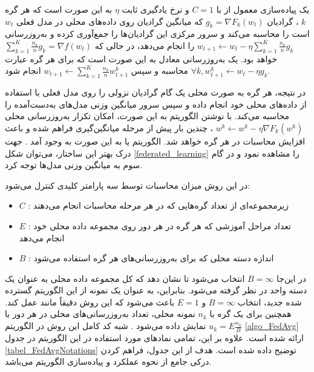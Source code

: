 یک پیاده‌سازی معمول از
با
$C = 1$
و نرخ یادگیری ثابت
$\eta$
به این صورت است که هر گره
$k$%
، گرادیان
$g_k=\nabla F_k\left(w_t\right)$
که میانگین گرادیان روی داده‌های محلی در مدل فعلی
$w_t$
است را محاسبه می‌کند و سرور مرکزی این گرادیان‌ها را جمع‌آوری کرده و به‌روزرسانی
$w_{t+1} \leftarrow w_t-\eta \sum_{k=1}^K \frac{n_k}{n} g_k$
را انجام می‌دهد، در حالی که
$\sum_{k=1}^K \frac{n_k}{n} g_k=\nabla f\left(w_t\right)$
خواهد بود. یک به‌روزرسانی معادل به این صورت است که برای هر گره عبارت
$\forall k, w_{t+1}^k \leftarrow w_t-\eta g_k$
محاسبه و سپس
$w_{t+1} \leftarrow \sum_{k=1}^K \frac{n_k}{n} w_{t+1}^k$
انجام شود.

در نتیجه، هر گره به صورت محلی یک گام گرادیان نزولی را روی مدل فعلی با استفاده از داده‌های محلی خود انجام داده و سپس سرور میانگین وزنی مدل‌های به‌دست‌آمده را محاسبه می‌کند. با نوشتن الگوریتم به این صورت، امکان تکرار به‌روزرسانی محلی
$w^k \leftarrow w^k-\eta \nabla F_k\left(w^k\right)$%
، چندین بار پیش از مرحله میانگین‌گیری فراهم شده و باعث افزایش محاسبات در هر گره خواهد شد. الگوریتم
یا
به این صورت به وجود آمد
\cite{mcmahan2017communication}.
جهت درک بهتر این ساختار، می‌توان شکل 
\ref{federated_learning} 
را مشاهده نمود و در گام سوم به میانگین وزنی مدل‌ها توجه کرد.

در این روش میزان محاسبات توسط سه پارامتر کلیدی کنترل می‌شود:
\begin{itemize}
	\itemsep-1mm 
	\item
	$C$%
: زیرمجموعه‌ای از تعداد گره‌هایی که در هر مرحله محاسبات انجام می‌دهند

	\item
	$E$%
: تعداد مراحل آموزشی که هر گره در هر دور روی مجموعه داده محلی خود انجام می‌دهد
	
	\item
	$B$%
: اندازه دسته محلی که برای به‌روزرسانی‌های هر گره استفاده می‌شود
	
\end{itemize}
در این‌جا
$B = \infty$
انتخاب می‌شود تا نشان دهد که کل مجموعه داده محلی به عنوان یک دسته واحد در نظر گرفته می‌شود. بنابراین، به عنوان یک نمونه از این الگوریتم گسترده شده جدید، انتخاب
$B = \infty$
و
$E = 1$
باعث می‌شود که این روش دقیقاً مانند
عمل کند. همچنین برای یک گره با
$n_k$
نمونه محلی، تعداد به‌روزرسانی‌های محلی در هر دور با
$u_k=E \frac{n_k}{B}$
نمایش داده می‌شود
\cite{mcmahan2017communication}.
شبه کد کامل این روش در الگوریتم
\ref{algo_FedAvg}
ارائه شده است. علاوه بر این، تمامی نمادهای مورد استفاده در این الگوریتم در جدول
\ref{tabel_FedAvgNotations}
توضیح داده شده است. هدف از این جدول، فراهم کردن درکی جامع از نحوه عملکرد و پیاده‌سازی الگوریتم می‌باشد.


